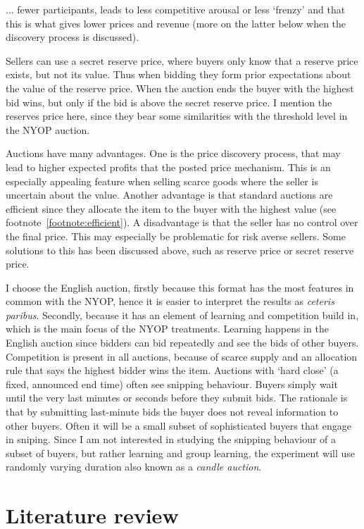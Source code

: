 \documentclass[a4paper,12pt]{article}
\begin{document}
	... fewer participants, leads to less competitive arousal or less `frenzy' and that this is what gives lower prices and revenue (more on the latter below when the discovery process is discussed). 

	Sellers can use a secret reserve price, where buyers only know that a reserve price exists, but not its value. Thus when bidding they form prior expectations about the value of the reserve price. When the auction ends the buyer with the highest bid wins, but only if the bid is above the secret reserve price. I mention the reserves price here, since they bear some similarities with the threshold level in the NYOP auction.

	Auctions have many advantages. One is the price discovery process, that may lead to higher expected profits that the posted price mechanism. This is an especially appealing feature when selling scarce goods where the seller is uncertain about the value. Another advantage is that standard auctions are efficient since they allocate the item to the buyer with the highest value (see footnote~\ref{footnote:efficient}). A disadvantage is that the seller has no control over the final price. This may especially be problematic for risk averse sellers. Some solutions to this has been discussed above, such as reserve price or secret reserve price.

	I choose the English auction, firstly because this format has the most features in common with the NYOP, hence it is easier to interpret the results as {\it ceteris paribus}. Secondly, because it has an element of learning and competition build in, which is the main focus of the NYOP treatments. Learning happens in the English auction since bidders can bid repeatedly and see the bids of other buyers. Competition is present in all auctions, because of scarce supply and an allocation rule that says the highest bidder wins the item. Auctions with `hard close' (a fixed, announced end time) often see snipping behaviour. Buyers simply wait until the very last minutes or seconds before they submit bids. The rationale is that by submitting last-minute bids the buyer does not reveal information to other buyers. Often it will be a small subset of sophisticated buyers that engage in sniping. Since I am not interested in studying the snipping behaviour of a subset of buyers, but rather learning and group learning, the experiment will use randomly varying duration also known as a {\it candle auction}.

	\section{Literature review}
\end{document}
